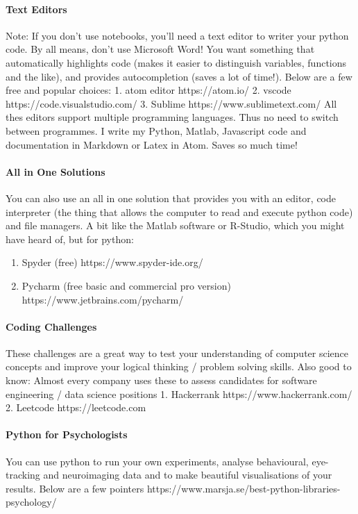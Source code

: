\documentclass[11pt]{article}
\providecommand{\tightlist}{%
      \setlength{\itemsep}{0pt}\setlength{\parskip}{0pt}}
\begin{document}
\paragraph{Text Editors}\label{text-editors}

Note: If you don't use notebooks, you'll need a text editor to writer
your python code. By all means, don't use Microsoft Word! You want
something that automatically highlights code (makes it easier to
distinguish variables, functions and the like), and provides
autocompletion (saves a lot of time!). Below are a few free and popular
choices: 1. atom editor https://atom.io/ 2. vscode
https://code.visualstudio.com/ 3. Sublime https://www.sublimetext.com/
All thes editors support multiple programming languages. Thus no need to
switch between programmes. I write my Python, Matlab, Javascript code
and documentation in Markdown or Latex in Atom. Saves so much time!

\paragraph{All in One Solutions}\label{all-in-one-solutions}

You can also use an all in one solution that provides you with an
editor, code interpreter (the thing that allows the computer to read and
execute python code) and file managers. A bit like the Matlab software
or R-Studio, which you might have heard of, but for python:

\begin{enumerate}
\def\labelenumi{\arabic{enumi}.}
\tightlist
\item
  Spyder (free) https://www.spyder-ide.org/
\item
  Pycharm (free basic and commercial pro version)
  https://www.jetbrains.com/pycharm/
\end{enumerate}

    \paragraph{Coding Challenges}\label{coding-challenges}

These challenges are a great way to test your understanding of computer
science concepts and improve your logical thinking / problem solving
skills. Also good to know: Almost every company uses these to assess
candidates for software engineering / data science positions 1.
Hackerrank https://www.hackerrank.com/ 2. Leetcode https://leetcode.com

    \paragraph{Python for Psychologists}\label{python-for-psychologists}

You can use python to run your own experiments, analyse behavioural,
eye-tracking and neuroimaging data and to make beautiful visualisations
of your results. Below are a few pointers
https://www.marsja.se/best-python-libraries-psychology/


    
    
    
    
\end{document}
